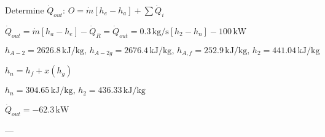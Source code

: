 Determine \( \dot{Q}_{out} \):  
\( O = \dot{m} [h_e - h_a] + \sum \dot{Q}_i \)  

\( \dot{Q}_{out} = \dot{m} [h_a - h_e] - \dot{Q}_R = \dot{Q}_{out} = 0.3 \, \text{kg/s} [h_2 - h_n] - 100 \, \text{kW} \)  

\( h_{A-2} = 2626.8 \, \text{kJ/kg}, \, h_{A-2g} = 2676.4 \, \text{kJ/kg}, \, h_{A,f} = 252.9 \, \text{kJ/kg}, \, h_2 = 441.04 \, \text{kJ/kg} \)  

\( h_n = h_f + x (h_g) \)  

\( h_n = 304.65 \, \text{kJ/kg}, \, h_2 = 436.33 \, \text{kJ/kg} \)  

\( \dot{Q}_{out} = -62.3 \, \text{kW} \)  

---